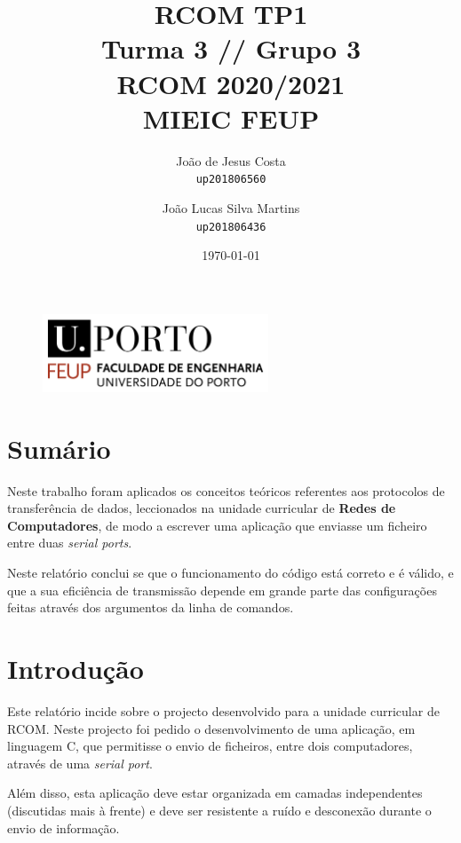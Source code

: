 \documentclass[11pt]{report}
\begin{document}
\title{\huge{\textbf{RCOM TP1}} \\ Turma 3 // Grupo 3 \\ RCOM 2020/2021 \\ MIEIC FEUP}
\author{João de Jesus Costa \\ \texttt{up201806560} \and
	João Lucas Silva Martins \\ \texttt{up201806436}}
\date{\today{}}

\begin{figure}[b]
	\centering
	\includegraphics[width=0.6\textwidth]{feup_logo.png}
\end{figure}
\maketitle{}

\tableofcontents{}
\newpage

\chapter{Sumário}

Neste trabalho foram aplicados os conceitos teóricos referentes aos protocolos
de transferência de dados, leccionados na unidade curricular de
\textbf{Redes de Computadores}, de modo a escrever uma aplicação que enviasse
um ficheiro entre duas \textit{serial ports}.

Neste relatório conclui se que o funcionamento do código está correto e é
válido, e que a sua eficiência de transmissão depende em grande parte das
configurações feitas através dos argumentos da linha de comandos.

{\let\clearpage\relax \chapter{Introdução}}

Este relatório incide sobre o projecto desenvolvido para a unidade curricular
de RCOM. Neste projecto foi pedido o desenvolvimento de uma aplicação, em
linguagem C, que permitisse o envio de ficheiros, entre dois computadores,
através de uma \textit{serial port}.

Além disso, esta aplicação deve estar organizada em camadas independentes
(discutidas mais à frente) e deve ser resistente a ruído e desconexão durante
o envio de informação.
\end{document}
